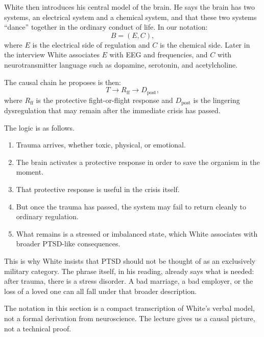 White then introduces his central model of the brain. He says the brain has two systems, an electrical system and a chemical system, and that these two systems ``dance'' together in the ordinary conduct of life. In our notation:
\begin{equation}
B=(E,C),
\end{equation}
where \(E\) is the electrical side of regulation and \(C\) is the chemical side. Later in the interview White associates \(E\) with EEG and frequencies, and \(C\) with neurotransmitter language such as dopamine, serotonin, and acetylcholine.

The causal chain he proposes is then:
\begin{equation}
T \to R_{\mathrm{ff}} \to D_{\mathrm{post}},
\end{equation}
where \(R_{\mathrm{ff}}\) is the protective fight-or-flight response and \(D_{\mathrm{post}}\) is the lingering dysregulation that may remain after the immediate crisis has passed.

The logic is as follows.
\begin{enumerate}
\item Trauma arrives, whether toxic, physical, or emotional.
\item The brain activates a protective response in order to save the organism in the moment.
\item That protective response is useful in the crisis itself.
\item But once the trauma has passed, the system may fail to return cleanly to ordinary regulation.
\item What remains is a stressed or imbalanced state, which White associates with broader PTSD-like consequences.
\end{enumerate}

This is why White insists that PTSD should not be thought of as an exclusively military category. The phrase itself, in his reading, already says what is needed: after trauma, there is a stress disorder. A bad marriage, a bad employer, or the loss of a loved one can all fall under that broader description.

\begin{remark}
The notation in this section is a compact transcription of White's verbal model, not a formal derivation from neuroscience. The lecture gives us a causal picture, not a technical proof.
\end{remark}

